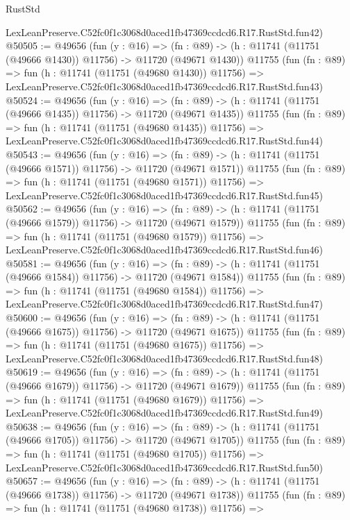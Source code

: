 \begin{lexlean}{RustStd}
\begin{coremodule}
    LexLeanPreserve.C52fc0f1c3068d0aced1fb47369ccdcd6.R17.RustStd.fun42)
@50505 := @49656
    (fun (y : @16) =>
    (fn : @89) -> (h : @11741 (@11751 (@49666 @1430)) @11756) -> @11720 (@49671 @1430))
    @11755
    (fun (fn : @89) =>
    fun (h : @11741 (@11751 (@49680 @1430)) @11756) =>
    LexLeanPreserve.C52fc0f1c3068d0aced1fb47369ccdcd6.R17.RustStd.fun43)
@50524 := @49656
    (fun (y : @16) =>
    (fn : @89) -> (h : @11741 (@11751 (@49666 @1435)) @11756) -> @11720 (@49671 @1435))
    @11755
    (fun (fn : @89) =>
    fun (h : @11741 (@11751 (@49680 @1435)) @11756) =>
    LexLeanPreserve.C52fc0f1c3068d0aced1fb47369ccdcd6.R17.RustStd.fun44)
@50543 := @49656
    (fun (y : @16) =>
    (fn : @89) -> (h : @11741 (@11751 (@49666 @1571)) @11756) -> @11720 (@49671 @1571))
    @11755
    (fun (fn : @89) =>
    fun (h : @11741 (@11751 (@49680 @1571)) @11756) =>
    LexLeanPreserve.C52fc0f1c3068d0aced1fb47369ccdcd6.R17.RustStd.fun45)
@50562 := @49656
    (fun (y : @16) =>
    (fn : @89) -> (h : @11741 (@11751 (@49666 @1579)) @11756) -> @11720 (@49671 @1579))
    @11755
    (fun (fn : @89) =>
    fun (h : @11741 (@11751 (@49680 @1579)) @11756) =>
    LexLeanPreserve.C52fc0f1c3068d0aced1fb47369ccdcd6.R17.RustStd.fun46)
@50581 := @49656
    (fun (y : @16) =>
    (fn : @89) -> (h : @11741 (@11751 (@49666 @1584)) @11756) -> @11720 (@49671 @1584))
    @11755
    (fun (fn : @89) =>
    fun (h : @11741 (@11751 (@49680 @1584)) @11756) =>
    LexLeanPreserve.C52fc0f1c3068d0aced1fb47369ccdcd6.R17.RustStd.fun47)
@50600 := @49656
    (fun (y : @16) =>
    (fn : @89) -> (h : @11741 (@11751 (@49666 @1675)) @11756) -> @11720 (@49671 @1675))
    @11755
    (fun (fn : @89) =>
    fun (h : @11741 (@11751 (@49680 @1675)) @11756) =>
    LexLeanPreserve.C52fc0f1c3068d0aced1fb47369ccdcd6.R17.RustStd.fun48)
@50619 := @49656
    (fun (y : @16) =>
    (fn : @89) -> (h : @11741 (@11751 (@49666 @1679)) @11756) -> @11720 (@49671 @1679))
    @11755
    (fun (fn : @89) =>
    fun (h : @11741 (@11751 (@49680 @1679)) @11756) =>
    LexLeanPreserve.C52fc0f1c3068d0aced1fb47369ccdcd6.R17.RustStd.fun49)
@50638 := @49656
    (fun (y : @16) =>
    (fn : @89) -> (h : @11741 (@11751 (@49666 @1705)) @11756) -> @11720 (@49671 @1705))
    @11755
    (fun (fn : @89) =>
    fun (h : @11741 (@11751 (@49680 @1705)) @11756) =>
    LexLeanPreserve.C52fc0f1c3068d0aced1fb47369ccdcd6.R17.RustStd.fun50)
@50657 := @49656
    (fun (y : @16) =>
    (fn : @89) -> (h : @11741 (@11751 (@49666 @1738)) @11756) -> @11720 (@49671 @1738))
    @11755
    (fun (fn : @89) =>
    fun (h : @11741 (@11751 (@49680 @1738)) @11756) =>

\end{coremodule}
\end{lexlean}
